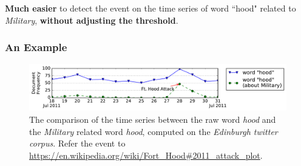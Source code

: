 \documentclass{beamer}
\begin{document}
\begin{frame}
\textbf{Much easier} to detect the event on the time series of word ``hood" related to \textit{Military}, \textbf{without adjusting the threshold}.
\frametitle{An Example}	
\begin{figure}[h]
		\setlength{\abovecaptionskip}{0.cm}
        \setlength{\belowcaptionskip}{0.cm}
        \centering
        \includegraphics[width=1.0\columnwidth]{img/hood.pdf}
        \caption{The comparison of the time series between the raw word \textit{hood} and the \textit{Military} related word \textit{hood}, computed on the \textit{Edinburgh twitter corpus}. Refer the event to \url{https://en.wikipedia.org/wiki/Fort_Hood\#2011_attack_plot}.}
        \label{fig:hood}
\end{figure}

\begin{figure}[h]
	\setlength{\abovecaptionskip}{0.cm}
	\setlength{\belowcaptionskip}{0.cm}
	\centering
\end{figure}


\end{frame}
\end{document}
